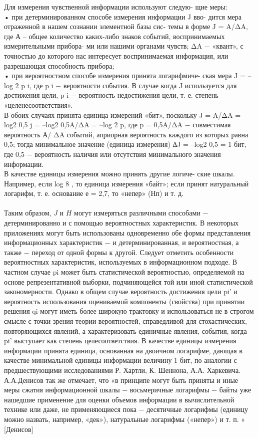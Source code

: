 \documentclass[a4paper,12pt]{report}
\begin{document}
Для измерения чувственной информации используют следую-
щие меры:\\
• при детерминированном способе измерения информации J вво-
дится мера отраженной в нашем сознании элементной базы сис-
темы в форме J = A/ΔA, где А – общее количество каких-либо
знаков событий, воспринимаемых измерительными прибора-
ми или нашими органами чувств; ΔA − «квант», с точностью
до которого нас интересует воспринимаемая информация, или
разрешающая способность прибора;\\
• при вероятностном способе измерения принята логарифмиче-
ская мера J = –log 2 p i, где p i − вероятности события. В случае когда J используется для достижения цели, p i − вероятность недостижения цели, т. е. степень «целенесоответствия».\\
В обоих случаях принята единица измерений «бит», поскольку
J = A/ΔA = –log2 0,5 j = –log2 0,5A/ΔA = –log 2 p, где p = 0,5A/ΔA − совместимая вероятность А/
ΔA событий, априорная вероятность каждого из
которых равна 0,5; тогда минимальное значение (единица измерения)
∆J = –log2 0,5 = 1 бит, где 0,5 − вероятность наличия или отсутствия
минимального значения информации.\\
В качестве единицы измерения можно принять другие логиче-
ские шкалы. Например, если log 8 , то единица измерения «байт»; если
принят натуральный логарифм, т. е. основание е = 2,7, то «непер»
(Нп) и т. д.\\
\\
	Таким образом, $J$ и $H$ могут измеряться различными способами − детерминированно и с помощью вероятностных характеристик. В некоторых приложениях могут быть использованы одновременно обе формы представления информационных характеристик − и детерминированная, и
вероятностная, а также − переход от одной формы к другой. Следует отметить особенности вероятностных характеристик, используемых в информационном подходе. В частном случае pi может быть статистической вероятностью, определяемой на основе репрезентативной выборки, подчиняющейся той или иной статистической закономерности. Однако в общем случае вероятность достижения цели pi' и вероятность использования оцениваемой компоненты (свойства) при принятии решения qi могут иметь более широкую трактовку и использоваться не в строгом смысле с точки зрения теории вероятностей, справедливой для стохастических, повторяющихся явлений, а характеризовать единичные явления, события, когда pi' выступает как степень целесоответствия. 	В качестве единицы измерения информации принята единица, основанная на двоичном логарифме, дающая в качестве минимальной единицы информации величину 1 бит, 	по аналогии с предшествующими исследованиями Р. Хартли, К. Шеннона, А.А. Харкевича. А.А.Денисов так же отмечает, что «в принципе могут быть приняты и иные меры сжатия информационной шкалы − восьмеричные логарифмы − байты  уже нашедшие применение для оценки объемов информации в вычислительной технике или даже, не применяющиеся пока − десятичные логарифмы (единицу можно назвать, например, «дек»), натуральные логарифмы («непер») и т. п. » [Денисов]
\end{document}
